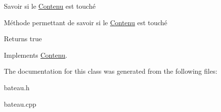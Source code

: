 Savoir si le \hyperlink{classContenu}{Contenu} est touché 

Méthode permettant de savoir si le \hyperlink{classContenu}{Contenu} est touché

\begin{DoxyReturn}{Returns}
true 
\end{DoxyReturn}


Implements \hyperlink{classContenu_af917356550ccc6025373c652b6e8b938}{Contenu}.



The documentation for this class was generated from the following files\+:\begin{DoxyCompactItemize}
\item 
bateau.\+h\item 
bateau.\+cpp\end{DoxyCompactItemize}

